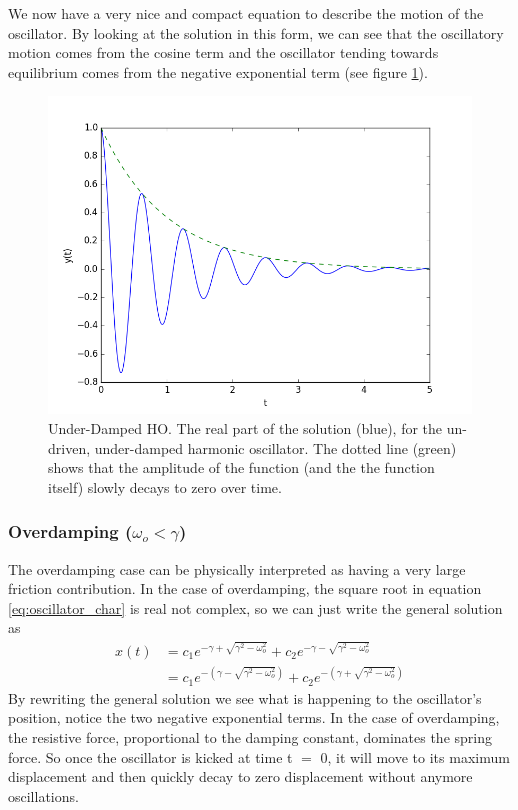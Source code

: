 \documentclass{article}
\newcommand{\be}{\begin{equation}}
\newcommand{\ee}{\end{equation}}
\begin{document}
We now have a very nice and compact equation to describe the motion of the oscillator.
By looking at the solution in this form, we can see that the oscillatory motion comes from the cosine term and the oscillator tending towards equilibrium comes from the negative exponential term (see figure \ref{fig:under_damped}).
\begin{figure}[h]
  \centering
  \includegraphics[scale=0.7]{Figures/under_damped.png}
    \caption{Under-Damped HO. The real part of the solution (blue), for the un-driven, under-damped harmonic oscillator.
    The dotted line (green) shows that the amplitude of the function (and the the function itself) slowly decays to zero over time.}
  \label{fig:under_damped}
\end{figure}
\newpage

\subsubsection*{Overdamping ($\omega_o < \gamma$)}
The overdamping case can be physically interpreted as having a very large friction contribution.
In the case of overdamping, the square root in equation \ref{eq:oscillator_char} is real not complex, so we can just write the general solution as
\be
\begin{split}
x(t) &= c_1 e^{-\gamma + \sqrt{\gamma^2 - \omega_o^2}} + c_2 e^{-\gamma - \sqrt{\gamma^2 - \omega_o^2}} \\
&= c_1 e^{-(\gamma - \sqrt{\gamma^2 - \omega_o^2})} + c_2 e^{-(\gamma + \sqrt{\gamma^2 - \omega_o^2})}
\end{split}
\ee
By rewriting the general solution we see what is happening to the oscillator's position, notice the two negative exponential terms.
In the case of overdamping, the resistive force, proportional to the damping constant, dominates the spring force.
So once the oscillator is kicked at time t $=$ 0, it will move to its maximum displacement and then quickly decay to zero displacement without anymore oscillations.
\end{document}
